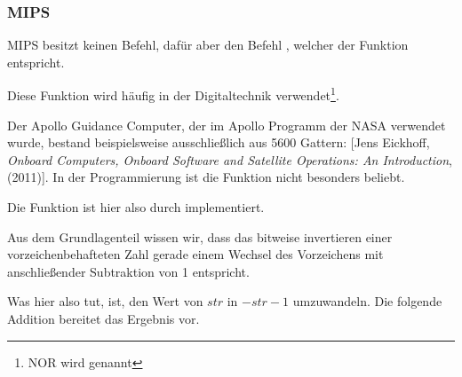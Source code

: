 \subsubsection{MIPS}




MIPS besitzt keinen \NOT Befehl, dafür aber den Befehl \NOT, welcher der
Funktion  entspricht.

Diese Funktion wird häufig in der Digitaltechnik verwendet\footnote{NOR wird
  genannt}.

Der Apollo Guidance Computer, der im Apollo Programm der NASA verwendet wurde,
bestand beispielsweise ausschließlich aus 5600 \NOR Gattern:
[Jens Eickhoff, \emph{Onboard Computers, Onboard Software and Satellite
Operations: An Introduction}, (2011)].
In der Programmierung ist die Funktion \NOT nicht besonders beliebt. 

Die \NOT Funktion ist hier also durch  implementiert.

Aus dem Grundlagenteil wissen wir, dass das bitweise
invertieren einer vorzeichenbehafteten Zahl gerade einem Wechsel des Vorzeichens
mit anschließender Subtraktion von 1 entspricht. 

Was \NOT hier also tut, ist, den Wert von $str$ in $-str-1$ umzuwandeln. 
Die folgende Addition bereitet das Ergebnis vor.
